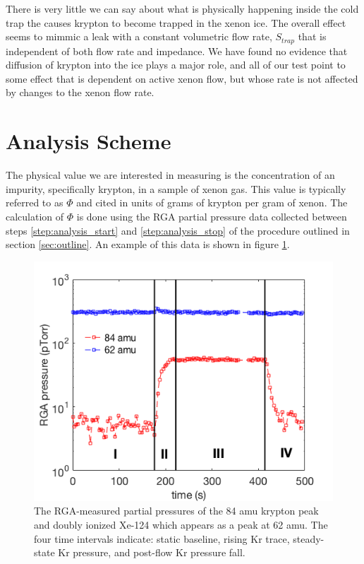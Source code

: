 \documentclass[12pt]{article}
\begin{document}
There is very little we can say about what is physically happening inside the cold trap the causes krypton to become trapped in the xenon ice. The overall effect seems to mimmic a leak with a constant volumetric flow rate, $S_{trap}$ that is independent of both flow rate and impedance. We have found no evidence that diffusion of krypton into the ice plays a major role, and all of our test point to some effect that is dependent on active xenon flow, but whose rate is not affected by changes to the xenon flow rate.

\section{Analysis Scheme}
The physical value we are interested in measuring is the concentration of an impurity, specifically krypton, in a sample of xenon gas. This value is typically referred to as $\Phi$ and cited in units of grams of krypton per gram of xenon. The calculation of $\Phi$ is done using the RGA partial pressure data collected between steps \ref{step:analysis_start} and \ref{step:analysis_stop} of the procedure outlined in section \ref{sec:outline}. An example of this data is shown in figure \ref{fig:RGAtrace}. 

\begin{figure}[h!]
  \includegraphics[width=\linewidth]{Figures/RGA_trace.png}
  \caption{The RGA-measured partial pressures of the 84 amu krypton peak and doubly ionized Xe-124 which appears as a peak at 62 amu. The four time intervals indicate: static baseline, rising Kr trace, steady-state Kr pressure, and post-flow Kr pressure fall.}
  \label{fig:RGAtrace}
\end{figure}
\end{document}
